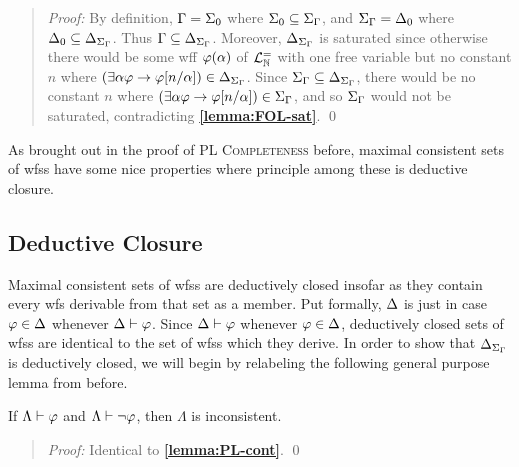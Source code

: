 \begin{quote} 
  \textit{Proof:} 
  By definition, $\Gamma=\Sigma_0$ where $\Sigma_0\subseteq\Sigma_{\Gamma}$, and $\Sigma_{\Gamma}=\Delta_0$ where $\Delta_0\subseteq\Delta_{\Sigma_{\Gamma}}$.
  Thus $\Gamma\subseteq\Delta_{\Sigma_{\Gamma}}$.
  Moreover, $\Delta_{\Sigma_{\Gamma}}$ is saturated since otherwise there would be some wff $\varphi(\alpha)$ of $\mathcal{L}^{=}_{\mathbb{N}}$ with one free variable but no constant $n$ where $(\exists \alpha\varphi \rightarrow \varphi[n/\alpha])\in\Delta_{\Sigma_{\Gamma}}$. 
  Since $\Sigma_{\Gamma}\subseteq\Delta_{\Sigma_{\Gamma}}$, there would be no constant $n$ where $(\exists \alpha\varphi \rightarrow \varphi[n/\alpha])\in\Sigma_{\Gamma}$, and so $\Sigma_{\Gamma}$ would not be saturated, contradicting \textbf{\ref{lemma:FOL-sat}}.
  \qed
\end{quote}

As brought out in the proof of \textsc{PL Completeness} before, maximal consistent sets of wfss have some nice properties where principle among these is deductive closure.



\subsection{Deductive Closure}%
  \label{sub:DeductiveClosure}

Maximal consistent sets of wfss are deductively closed insofar as they contain every wfs derivable from that set as a member.
Put formally, $\Delta$ is  just in case $\varphi\in\Delta$ whenever $\Delta\vdash\varphi$.
Since $\Delta\vdash\varphi$ whenever $\varphi\in\Delta$, deductively closed sets of wfss are identical to the set of wfss which they derive.
In order to show that $\Delta_{\Sigma_{\Gamma}}$ is deductively closed, we will begin by relabeling the following general purpose lemma from before. 

\begin{Lthm} \label{lemma:FOL-cont}
  If $\Lambda\vdash\varphi$ and $\Lambda\vdash\neg\varphi$, then $\Lambda$ is inconsistent. 
\end{Lthm}

\begin{quote} 
  \textit{Proof:} 
  Identical to \textbf{\ref{lemma:PL-cont}}.
  \qed
\end{quote}
  




